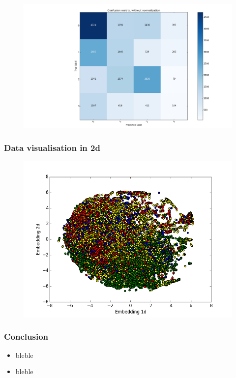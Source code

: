 \documentclass{beamer}
\begin{document}
\begin{frame}
\begin{figure}
\begin{minipage}[b]{0.5\linewidth}
    \vspace{2ex}
  \end{minipage}%
  \begin{minipage}[b]{0.5\linewidth}
    \centering
    \includegraphics[width=1\linewidth]{../REPORT/Figures_Mik/cosSimConfMat2.png} 
    \vspace{2ex}
  \end{minipage} 
\end{figure}
\end{frame}


\begin{frame}
\frametitle{Data visualisation in 2d}
\begin{figure}
\includegraphics[width=0.8\linewidth]{../REPORT/Figures_Mik/embedding2DTrue_labelsColor2.png}  
\end{figure}
\end{frame}


\begin{frame}
\frametitle{Conclusion}
\begin{itemize} 
\item bleble
\item bleble
\end{itemize}
\end{frame}



 
 
 
\end{document}
